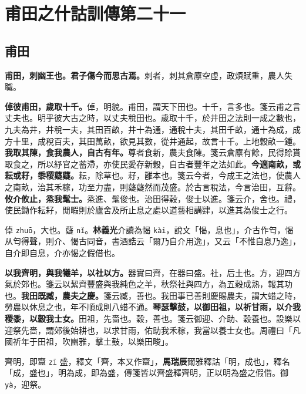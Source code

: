 \chapter{甫田之什詁訓傳第二十一}

\section{甫田}


\textbf{甫田，刺幽王也。君子傷今而思古焉。}{\footnotesize 刺者，刺其倉廪空虛，政煩賦重，農人失職。}

\textbf{倬彼甫田，歲取十千。}{\footnotesize 倬，明貌。甫田，謂天下田也。十千，言多也。箋云甫之言丈夫也。明乎彼大古之時，以丈夫稅田也。歲取十千，於井田之法則一成之數也，九夫為井，井稅一夫，其田百畝，井十為通，通稅十夫，其田千畝，通十為成，成方十里，成稅百夫，其田萬畝，欲見其數，從井通起，故言十千。上地穀畝一鍾。}\textbf{我取其陳，食我農人，自古有年。}{\footnotesize 尊者食新，農夫食陳。箋云倉廪有餘，民得賒貰取食之，所以紓官之蓄滯，亦使民愛存新穀，自古者豐年之法如此。}\textbf{今適南畝，或耘或耔，黍稷薿薿。}{\footnotesize 耘，除草也。耔，雝本也。箋云今者，今成王之法也，使農人之南畝，治其禾稼，功至力盡，則薿薿然而茂盛。於古言稅法，今言治田，互辭。}\textbf{攸介攸止，烝我髦士。}{\footnotesize 烝進、髦俊也。治田得穀，俊士以進。箋云介，舍也。禮，使民鋤作耘耔，閒暇則於廬舍及所止息之處以道藝相講肄，以進其為俊士之行。}

\begin{quoting}倬 \texttt{zhuō}，大也。薿 \texttt{nǐ}。\textbf{林義光}介讀為愒 \texttt{kài}，說文「愒，息也」，介古作匄，愒从匄得聲，則介、愒古同音，書酒誥云「爾乃自介用逸」，又云「不惟自息乃逸」，自介即自息，介亦愒之假借也。\end{quoting}

\textbf{以我齊明，與我犧羊，以社以方。}{\footnotesize 器實曰齊，在器曰盛。社，后土也。方，迎四方氣於郊也。箋云以絜齊豐盛與我純色之羊，秋祭社與四方，為五穀成熟，報其功也。}\textbf{我田既臧，農夫之慶。}{\footnotesize 箋云臧，善也。我田事已善則慶賜農夫，謂大蜡之時，勞農以休息之也，年不順成則八蜡不通。}\textbf{琴瑟擊鼓，以御田祖，以祈甘雨，以介我稷黍，以穀我士女。}{\footnotesize 田祖，先嗇也。穀，善也。箋云御迎、介助、穀養也。設樂以迎祭先嗇，謂郊後始耕也，以求甘雨，佑助我禾稼，我當以養士女也。周禮曰「凡國祈年于田祖，吹豳雅，擊土鼓，以樂田畯」。}

\begin{quoting}齊明，即齍 \texttt{zī} 盛，釋文「齊，本又作齍」，\textbf{馬瑞辰}爾雅釋詁「明，成也」，釋名「成，盛也」，明為成，即為盛，傳箋皆以齊盛釋齊明，正以明為盛之假借。御 \texttt{yà}，迎祭。\end{quoting}

